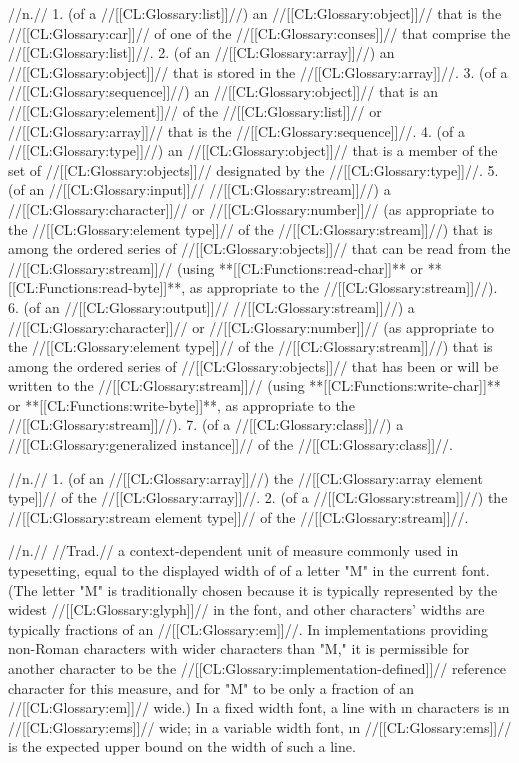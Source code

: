  //n.// 1. (of a //[[CL:Glossary:list]]//) an //[[CL:Glossary:object]]// that is the //[[CL:Glossary:car]]// of one of the //[[CL:Glossary:conses]]// that comprise the //[[CL:Glossary:list]]//. 2. (of an //[[CL:Glossary:array]]//) an //[[CL:Glossary:object]]// that is stored in the //[[CL:Glossary:array]]//. 3. (of a //[[CL:Glossary:sequence]]//) an //[[CL:Glossary:object]]// that is an //[[CL:Glossary:element]]// of the //[[CL:Glossary:list]]// or //[[CL:Glossary:array]]// that is the //[[CL:Glossary:sequence]]//. 4. (of a //[[CL:Glossary:type]]//) an //[[CL:Glossary:object]]// that is a member of the set of //[[CL:Glossary:objects]]// designated by the //[[CL:Glossary:type]]//. 5. (of an //[[CL:Glossary:input]]// //[[CL:Glossary:stream]]//) a //[[CL:Glossary:character]]// or //[[CL:Glossary:number]]// (as appropriate to the //[[CL:Glossary:element type]]// of the //[[CL:Glossary:stream]]//) that is among the ordered series of //[[CL:Glossary:objects]]// that can be read from the //[[CL:Glossary:stream]]// (using **[[CL:Functions:read-char]]** or **[[CL:Functions:read-byte]]**, as appropriate to the //[[CL:Glossary:stream]]//). 6. (of an //[[CL:Glossary:output]]// //[[CL:Glossary:stream]]//) a //[[CL:Glossary:character]]// or //[[CL:Glossary:number]]// (as appropriate to the //[[CL:Glossary:element type]]// of the //[[CL:Glossary:stream]]//) that is among the ordered series of //[[CL:Glossary:objects]]// that has been or will be written to the //[[CL:Glossary:stream]]// (using **[[CL:Functions:write-char]]** or **[[CL:Functions:write-byte]]**, as appropriate to the //[[CL:Glossary:stream]]//). 7. (of a //[[CL:Glossary:class]]//) a //[[CL:Glossary:generalized instance]]// of the //[[CL:Glossary:class]]//.

 //n.// 1. (of an //[[CL:Glossary:array]]//) the //[[CL:Glossary:array element type]]// of the //[[CL:Glossary:array]]//. 2. (of a //[[CL:Glossary:stream]]//) the //[[CL:Glossary:stream element type]]// of the //[[CL:Glossary:stream]]//.

 //n.// //Trad.// a context-dependent unit of measure commonly used in typesetting, equal to the displayed width of of a letter "M" in the current font. (The letter "M" is traditionally chosen because it is typically represented by the widest //[[CL:Glossary:glyph]]// in the font, and other characters' widths are typically fractions of an //[[CL:Glossary:em]]//. In implementations providing non-Roman characters with wider characters than "M," it is permissible for another character to be the //[[CL:Glossary:implementation-defined]]// reference character for this measure, and for "M" to be only a fraction of an //[[CL:Glossary:em]]// wide.) In a fixed width font, a line with \i{n} characters is \i{n} //[[CL:Glossary:ems]]// wide; in a variable width font, \i{n} //[[CL:Glossary:ems]]// is the expected upper bound on the width of such a line.


